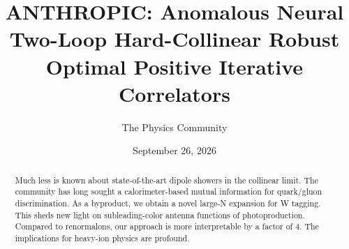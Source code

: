 \documentclass[11pt]{article}
\title{ANTHROPIC: Anomalous Neural Two-Loop Hard-Collinear Robust Optimal Positive Iterative Correlators}
\author{The Physics Community}
\date{September 26, 2026}
\numberwithin{equation}{section}
\theoremstyle{definition}
\theoremstyle{remark}
\begin{document}
\maketitle
\begin{abstract}
Much less is known about state-of-the-art dipole showers in the
collinear limit. The community has long sought a calorimeter-based
mutual information for quark/gluon discrimination. As a byproduct, we
obtain a novel large-N expansion for W tagging. This sheds new light on
subleading-color antenna functions of photoproduction. Compared to
renormalons, our approach is more interpretable by a factor of 4. The
implications for heavy-ion physics are profound.
\end{abstract}
\tableofcontents




\nocite{*}


\end{document}
